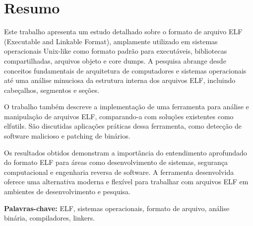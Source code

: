 \chapter*{Resumo}

Este trabalho apresenta um estudo detalhado sobre o formato de arquivo ELF (Executable and Linkable Format), amplamente utilizado em sistemas operacionais Unix-like como formato padrão para executáveis, bibliotecas compartilhadas, arquivos objeto e core dumps. A pesquisa abrange desde conceitos fundamentais de arquitetura de computadores e sistemas operacionais até uma análise minuciosa da estrutura interna dos arquivos ELF, incluindo cabeçalhos, segmentos e seções.

O trabalho também descreve a implementação de uma ferramenta para análise e manipulação de arquivos ELF, comparando-a com soluções existentes como elfutils. São discutidas aplicações práticas dessa ferramenta, como detecção de software malicioso e patching de binários.

Os resultados obtidos demonstram a importância do entendimento aprofundado do formato ELF para áreas como desenvolvimento de sistemas, segurança computacional e engenharia reversa de software. A ferramenta desenvolvida oferece uma alternativa moderna e flexível para trabalhar com arquivos ELF em ambientes de desenvolvimento e pesquisa.

\vspace{0.5cm}
\noindent
\textbf{Palavras-chave:} ELF, sistemas operacionais, formato de arquivo, análise binária, compiladores, linkers.